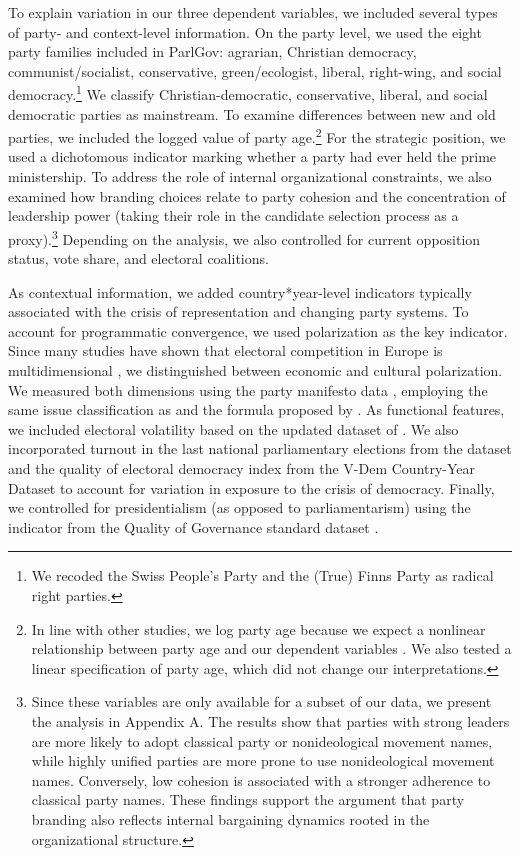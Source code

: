 \documentclass[12pt]{article}
\begin{document}
To explain variation in our three dependent variables, we included several types of party- and context-level information. On the party level, we used the eight party families included in ParlGov: agrarian, Christian democracy, communist/socialist, conservative, green/ecologist, liberal, right-wing, and social democracy.\footnote{We recoded the Swiss People's Party and the (True) Finns Party as radical right parties.} We classify Christian-democratic, conservative, liberal, and social democratic parties as mainstream. To examine differences between new and old parties, we included the logged value of party age.\footnote{In line with other studies, we log party age because we expect a nonlinear relationship between party age and our dependent variables \citep[see also][]{Avina_2023}. We also tested a linear specification of party age, which did not change our interpretations.} For the strategic position, we used a dichotomous indicator marking whether a party had ever held the prime ministership. To address the role of internal organizational constraints, we also examined how branding choices relate to party cohesion and the concentration of leadership power (taking their role in the candidate selection process as a proxy).\footnote{Since these variables are only available for a subset of our data, we present the analysis in Appendix A. The results show that parties with strong leaders are more likely to adopt classical party or nonideological movement names, while highly unified parties are more prone to use nonideological movement names. Conversely, low cohesion is associated with a stronger adherence to classical party names. These findings support the argument that party branding also reflects internal bargaining dynamics rooted in the organizational structure.} Depending on the analysis, we also controlled for current opposition status, vote share, and electoral coalitions.

As contextual information, we added country*year-level indicators typically associated with the crisis of representation and changing party systems. To account for programmatic convergence, we used polarization as the key indicator. Since many studies have shown that electoral competition in Europe is multidimensional \citep[e.g.,][]{Kriesi_et_al_2008, Kriesi_et_al_2012, Hooghe_Marks_2018}, we distinguished between economic and cultural polarization. We measured both dimensions using the party manifesto data \citep{Lehmann_et_al_2023}, employing the same issue classification as \citet[][p.~67]{Hutter_Kriesi_2019} and the formula proposed by \citet[][p.~906]{Dalton_2008a}. As functional features, we included electoral volatility based on the updated dataset of \citet{Emanuele_Chiaramonte_Soare_2020}. We also incorporated turnout in the last national parliamentary elections from the \citet{IDEA_2020} dataset and the quality of electoral democracy index from the V-Dem Country-Year Dataset \citep{Coppedge_et_al_2024} to account for variation in exposure to the crisis of democracy. Finally, we controlled for presidentialism (as opposed to parliamentarism) using the indicator from the Quality of Governance standard dataset \citep{Teorell_et_al_2025}.
\end{document}
